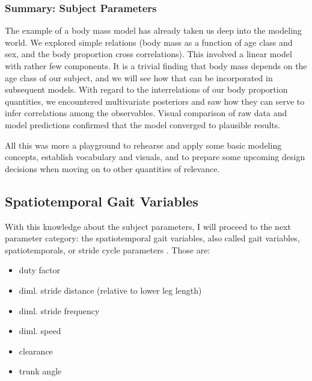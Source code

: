 \subsubsection{Summary: Subject Parameters}
\label{sec:orge0c65f9}
The example of a body mass model has already taken us deep into the modeling world.
We explored simple relations (body mass as a function of age class and sex, and the body proportion cross correlations).
This involved a linear model with rather few components.
It is a trivial finding that body mass depends on the age class of our subject, and we will see how that can be incorporated in subsequent models.
With regard to the interrelations of our body proportion quantities, we encountered multivariate posteriors and saw how they can serve to infer correlations among the observables.
Visual comparison of raw data and model predictions confirmed that the model converged to plausible results.

All this was more a playground to rehearse and apply some basic modeling concepts, establish vocabulary and visuals, and to prepare some upcoming design decisions when moving on to other quantities of relevance.

\FloatBarrier\clearpage
\subsection{Spatiotemporal Gait Variables}
\label{sec:org69bec74}
With this knowledge about the subject parameters, I will proceed to the next parameter category: the spatiotemporal gait variables, also called gait variables, spatiotemporals, or stride cycle parameters . Those are:
\begin{itemize}
\item duty factor
\item diml. stride distance (relative to lower leg length)
\item diml. stride frequency
\item diml. speed
\item clearance
\item trunk angle
\end{itemize}


